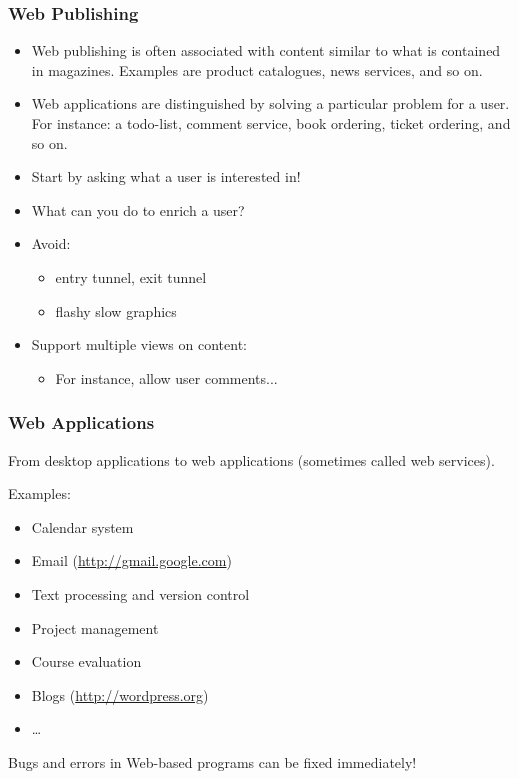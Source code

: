 \documentclass[dvipsnames]{beamer}
\begin{document}
\begin{frame}
\frametitle{Web Publishing}

\begin{itemize}
\item Web publishing is often associated with content similar to what
  is contained in magazines. Examples are product catalogues, news
  services, and so on.
  
\item Web applications are distinguished by solving a particular problem
  for a user. For instance: a todo-list, comment service, book
  ordering, ticket ordering, and so on.

\item Start by asking what a user is interested in!

\item What can you do to enrich a user?

\item Avoid:
\begin{itemize}
\item entry tunnel, exit tunnel
\item flashy slow graphics
\end{itemize}

\item Support multiple views on content:
\begin{itemize}
\item For instance, allow user comments...
\end{itemize}
\end{itemize}
\end{frame}



\begin{frame}
\frametitle{Web Applications}

From desktop applications to web applications (sometimes called web
services).


Examples:
\begin{itemize}
\item Calendar system
\item Email (\url{http://gmail.google.com})
\item Text processing and version control
\item Project management
\item Course evaluation
\item Blogs (\url{http://wordpress.org})
\item \ldots
\end{itemize}

Bugs and errors in Web-based programs can be fixed immediately!
\end{frame}
\end{document}
